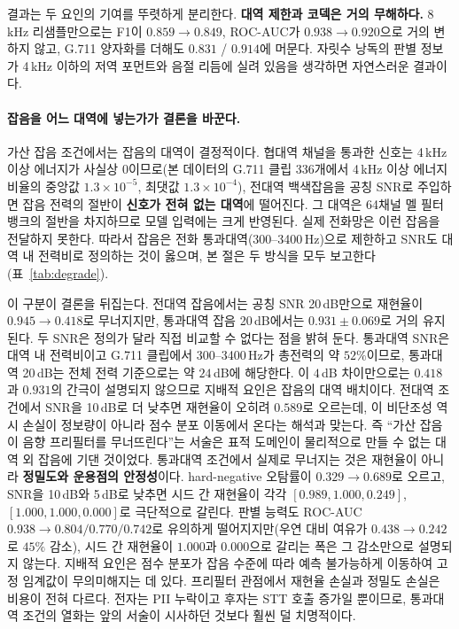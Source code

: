 \documentclass[11pt]{article}
\renewcommand{\emph}[1]{\textbf{#1}}
\begin{document}
결과는 두 요인의 기여를 뚜렷하게 분리한다. \emph{대역 제한과 코덱은 거의 무해하다.} 8\,kHz
리샘플만으로는 F1이 $0.859\to0.849$, ROC-AUC가 $0.938\to0.920$으로 거의 변하지 않고, G.711
양자화를 더해도 $0.831$ / $0.914$에 머문다. 자릿수 낭독의 판별 정보가 4\,kHz 이하의 저역
포먼트와 음절 리듬에 실려 있음을 생각하면 자연스러운 결과이다.

\paragraph{잡음을 어느 대역에 넣는가가 결론을 바꾼다.}
가산 잡음 조건에서는 잡음의 대역이 결정적이다. 협대역 채널을 통과한 신호는 4\,kHz 이상 에너지가
사실상 0이므로(본 데이터의 G.711 클립 336개에서 4\,kHz 이상 에너지 비율의 중앙값 $1.3\times10^{-5}$,
최댓값 $1.3\times10^{-4}$), 전대역 백색잡음을 공칭 SNR로
주입하면 잡음 전력의 절반이 \emph{신호가 전혀 없는 대역}에 떨어진다. 그 대역은 64채널 멜
필터뱅크의 절반을 차지하므로 모델 입력에는 크게 반영된다. 실제 전화망은 이런 잡음을 전달하지
못한다. 따라서 잡음은 전화 통과대역(300--3400\,Hz)으로 제한하고 SNR도 대역 내 전력비로
정의하는 것이 옳으며, 본 절은 두 방식을 모두 보고한다(표~\ref{tab:degrade}).

이 구분이 결론을 뒤집는다. 전대역 잡음에서는 공칭 SNR 20\,dB만으로 재현율이
$0.945\to0.418$로 무너지지만, 통과대역 잡음 20\,dB에서는 $0.931\pm0.069$로 거의 유지된다.
두 SNR은 정의가 달라 직접 비교할 수 없다는 점을 밝혀 둔다. 통과대역 SNR은 대역 내 전력비이고
G.711 클립에서 300--3400\,Hz가 총전력의 약 $52\%$이므로, 통과대역 20\,dB는 전체 전력 기준으로는
약 $24$\,dB에 해당한다. 이 $4$\,dB 차이만으로는 $0.418$과 $0.931$의 간극이 설명되지 않으므로
지배적 요인은 잡음의 대역 배치이다. 전대역 조건에서 SNR을 10\,dB로 더 낮추면 재현율이 오히려
$0.589$로 오르는데, 이 비단조성 역시 손실이 정보량이 아니라 점수 분포 이동에서 온다는 해석과
맞는다. 즉 ``가산
잡음이 음향 프리필터를 무너뜨린다''는 서술은 표적 도메인이 물리적으로 만들 수 없는 대역 외
잡음에 기댄 것이었다. 통과대역 조건에서 실제로 무너지는 것은 재현율이 아니라 \emph{정밀도와
운용점의 안정성}이다. hard-negative 오탐률이 $0.329\to0.689$로 오르고, SNR을 10\,dB와
5\,dB로 낮추면 시드 간 재현율이 각각 $[0.989, 1.000, 0.249]$, $[1.000, 1.000, 0.000]$로
극단적으로 갈린다. 판별 능력도 ROC-AUC $0.938\to0.804/0.770/0.742$로 유의하게 떨어지지만(우연 대비 여유가
$0.438\to0.242$로 $45\%$ 감소), 시드 간 재현율이 $1.000$과 $0.000$으로 갈리는 폭은 그 감소만으로
설명되지 않는다. 지배적 요인은 점수 분포가 잡음 수준에 따라 예측 불가능하게 이동하여 고정
임계값이 무의미해지는 데 있다.
프리필터 관점에서 재현율 손실과 정밀도 손실은 비용이 전혀 다르다. 전자는 PII 누락이고 후자는
STT 호출 증가일 뿐이므로, 통과대역 조건의 열화는 앞의 서술이 시사하던 것보다 훨씬 덜 치명적이다.
\end{document}
